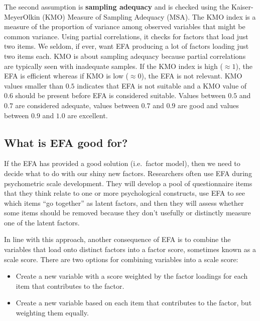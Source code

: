 \documentclass[
  a4paper,
]{book}
\providecommand{\tightlist}{%
  \setlength{\itemsep}{0pt}\setlength{\parskip}{0pt}}\usepackage{longtable,booktabs,array}
\begin{document}
The second assumption is \textbf{sampling adequacy} and is checked using
the Kaiser-MeyerOlkin (KMO) Measure of Sampling Adequacy (MSA). The KMO
index is a measure of the proportion of variance among observed
variables that might be common variance. Using partial correlations, it
checks for factors that load just two items. We seldom, if ever, want
EFA producing a lot of factors loading just two items each. KMO is about
sampling adequacy because partial correlations are typically seen with
inadequate samples. If the KMO index is high (\(\approx 1\)), the EFA is
efficient whereas if KMO is low (\(\approx 0\)), the EFA is not
relevant. KMO values smaller than \(0.5\) indicates that EFA is not
suitable and a KMO value of \(0.6\) should be present before EFA is
considered suitable. Values between \(0.5\) and \(0.7\) are considered
adequate, values between \(0.7\) and \(0.9\) are good and values between
\(0.9\) and \(1.0\) are excellent.

\hypertarget{what-is-efa-good-for}{%
\subsection{What is EFA good for?}\label{what-is-efa-good-for}}

If the EFA has provided a good solution (i.e.~factor model), then we
need to decide what to do with our shiny new factors. Researchers often
use EFA during psychometric scale development. They will develop a pool
of questionnaire items that they think relate to one or more
psychological constructs, use EFA to see which items ``go together'' as
latent factors, and then they will assess whether some items should be
removed because they don't usefully or distinctly measure one of the
latent factors.

In line with this approach, another consequence of EFA is to combine the
variables that load onto distinct factors into a factor score, sometimes
known as a scale score. There are two options for combining variables
into a scale score:

\begin{itemize}
\tightlist
\item
  Create a new variable with a score weighted by the factor loadings for
  each item that contributes to the factor.
\item
  Create a new variable based on each item that contributes to the
  factor, but weighting them equally.
\end{itemize}
\end{document}
